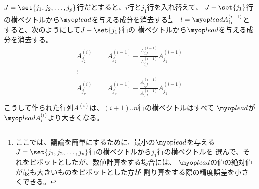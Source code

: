 \begin{procedure}[ガウス消去法]
\begin{description}
			$J=\set{j_1,j_2,\dots,j_p}$行だとすると、$i$行と$j_1$行を入れ替えて、
			$J-\set{j_1}$行の横ベクトルから$\lead$を与える成分を消去する\footnote{
				ここでは、議論を簡単にするために、最小の$\lead$を与える
				$J=\set{j_1,j_2,\dots,j_p}$行の横ベクトルから$j_1$行の横ベクトルを
				選んで、それをピボットとしたが、数値計算をする場合には、
				$\lead$の値の絶対値が最も大きいものをピボットとした方が
				割り算をする際の精度誤差を小さくできる。
			}。
			$l=\lead A_{i_1}^{(i-1)}$とすると、次のようにして$J-\set{j_1}$行の
			横ベクトルから$\lead$を与える成分を消去する。
			\begin{equation*}\begin{split} %
				A_{j_2}^{(i)} &= A_{j_2}^{(i-1)} 
					- \frac{A_{j_2l}^{(i-1)}}{A_{j_1l}^{(i-1)}}A_{j_1}^{(i-1)} \\
				\vdots \\
				A_{j_p}^{(i)} &= A_{j_p}^{(i-1)} 
					- \frac{A_{j_pl}^{(i-1)}}{A_{j_1l}^{(i-1)}}A_{j_1}^{(i-1)} \\
			\end{split}\end{equation*} %
			こうして作られた行列$A^{(i)}$は、$(i+1)..n$行の横ベクトルはすべて
			$\lead$が$\lead A_i^{(i)}$より大きくなる。
		\end{description} %
	\end{procedure} %

